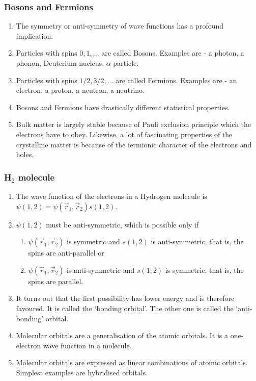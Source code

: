\documentclass{beamer}
\begin{document}
\begin{frame}
\frametitle{Bosons and Fermions}
\begin{enumerate}
\item The symmetry or anti-symmetry of wave functions has a profound implication.
\item Particles with spins $0, 1, \ldots$ are called Bosons. Examples are - a
photon, a phonon, Deuterium nucleus, $\alpha$-particle.
\item Particles with spins $1/2, 3/2, \ldots$ are called Fermions. Examples are
- an electron, a proton, a neutron, a neutrino.
\item Bosons and Fermions have drastically different statistical properties.
\item Bulk matter is largely stable because of Pauli exclusion principle which
the electrons have to obey. Likewise, a lot of fascinating properties of the
crystalline matter is because of the fermionic character of the electrons and
holes.
\end{enumerate}
\end{frame}

\begin{frame}
\frametitle{H$_{2}$ molecule}
\begin{enumerate}
\item The wave function of the electrons in a Hydrogen molecule is $\psi(1, 2) =
\psi(\vec{r}_1, \vec{r}_2)s(1, 2)$.
\item $\psi(1, 2)$ must be anti-symmetric, which is possible only if
\begin{enumerate}
\item $\psi(\vec{r}_1, \vec{r}_2)$ is symmetric and $s(1, 2)$ is anti-symmetric,
that is, the spins are anti-parallel or
\item $\psi(\vec{r}_1, \vec{r}_2)$ is anti-symmetric and $s(1, 2)$ is symmetric,
that is, the spins are parallel.
\end{enumerate}
\item It turns out that the first possibility has lower energy and is therefore
favoured. It is called the `bonding orbital'. The other one is called the `anti-
bonding' orbital.
\item Molecular orbitals are a generalisation of the atomic orbitals. It is a
one-electron wave function in a molecule.
\item Molecular orbitals are expressed as linear combinations of atomic 
orbitals. Simplest examples are hybridised orbitals.
\end{enumerate}
\end{frame}
\end{document}
